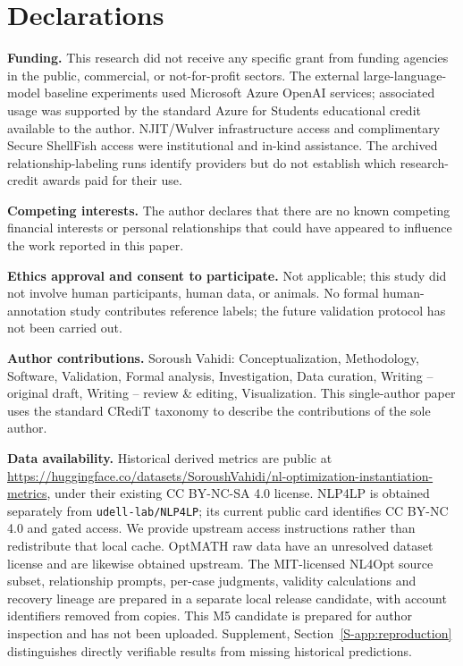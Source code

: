 \documentclass[pdflatex,sn-basic,Numbered]{sn-jnl}
\begin{document}
\section*{Declarations}

\noindent\textbf{Funding.} This research did not receive any specific grant from funding agencies in the public, commercial, or not-for-profit sectors. The external large-language-model baseline experiments used Microsoft Azure OpenAI services; associated usage was supported by the standard Azure for Students educational credit available to the author. NJIT/Wulver infrastructure access and complimentary Secure ShellFish access were institutional and in-kind assistance. The archived relationship-labeling runs identify providers but do not establish which research-credit awards paid for their use.

\noindent\textbf{Competing interests.} The author declares that there are no known competing financial interests or personal relationships that could have appeared to influence the work reported in this paper.

\noindent\textbf{Ethics approval and consent to participate.} Not applicable; this study did not involve human participants, human data, or animals. No formal human-annotation study contributes reference labels; the future validation protocol has not been carried out.

\noindent\textbf{Author contributions.} Soroush Vahidi: Conceptualization, Methodology, Software, Validation, Formal analysis, Investigation, Data curation, Writing -- original draft, Writing -- review \& editing, Visualization. This single-author paper uses the standard CRediT taxonomy to describe the contributions of the sole author.

\noindent\textbf{Data availability.} Historical derived metrics are public at \url{https://huggingface.co/datasets/SoroushVahidi/nl-optimization-instantiation-metrics}, under their existing CC BY-NC-SA 4.0 license. NLP4LP is obtained separately from \texttt{udell-lab/NLP4LP}; its current public card identifies CC BY-NC 4.0 and gated access. We provide upstream access instructions rather than redistribute that local cache. OptMATH raw data have an unresolved dataset license and are likewise obtained upstream. The MIT-licensed NL4Opt source subset, relationship prompts, per-case judgments, validity calculations and recovery lineage are prepared in a separate local release candidate, with account identifiers removed from copies. This M5 candidate is prepared for author inspection and has not been uploaded. Supplement, Section~\ref{S-app:reproduction} distinguishes directly verifiable results from missing historical predictions.
\end{document}
